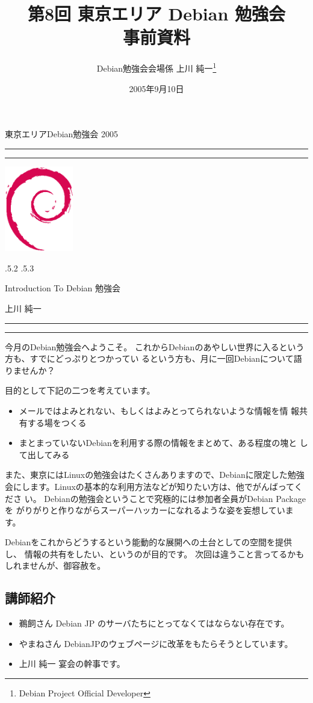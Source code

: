 \documentclass[mingoth,a4paper]{jsarticle}
\makeatletter
\renewcommand{\section}{\@startsection{section}{1}{\z@}%
    {\Cvs \@plus.5\Cdp \@minus.2\Cdp}%
    {.5\Cvs \@plus.3\Cdp}%
    {\normalfont\Large\headfont\raggedright\centering}} %
\newcommand{\dancersection}[2]{%
\newpage
東京エリアDebian勉強会 2005
\hrule
\vspace{0.5mm}
\hrule
\hfill{}\includegraphics[width=3cm]{image200502/openlogo-nd.eps}\\
\vspace{-4cm}
\begin{center}
  \section{#1}
\end{center}
\hfill{}#2\hspace{3cm}\space\\
\hrule
\hrule
\vspace{1cm}
}
\makeatother
\begin{document}
\begin{titlepage}

\title{
 第8回 東京エリア Debian 勉強会\\事前資料}
\date{2005年9月10日}
\author{Debian勉強会会場係 上川 純一\thanks{Debian Project Official Developer}} 
\maketitle
\thispagestyle{empty}
\end{titlepage}

\newpage
\tableofcontents

\dancersection{Introduction To Debian 勉強会}{上川 純一}

今月のDebian勉強会へようこそ。
これからDebianのあやしい世界に入るという方も、すでにどっぷりとつかってい
るという方も、月に一回Debianについて語りませんか？

目的として下記の二つを考えています。

\begin{itemize}
 \item メールではよみとれない、もしくはよみとってられないような情報を情
       報共有する場をつくる
 \item まとまっていないDebianを利用する際の情報をまとめて、ある程度の塊と
       して出してみる
\end{itemize}

また、東京にはLinuxの勉強会はたくさんありますので、Debianに限定した勉強
会にします。Linuxの基本的な利用方法などが知りたい方は、他でがんばってくださ
い。
Debianの勉強会ということで究極的には参加者全員がDebian Packageを
がりがりと作りながらスーパーハッカーになれるような姿を妄想しています。

Debianをこれからどうするという能動的な展開への土台としての空間を提供し、
情報の共有をしたい、というのが目的です。
次回は違うこと言ってるかもしれませんが、御容赦を。

\subsection{講師紹介}

\begin{itemize}
 \item{鵜飼さん} Debian JP のサーバたちにとってなくてはならない存在です。
 \item{やまねさん} DebianJPのウェブページに改革をもたらそうとしています。
 \item{上川 純一} 宴会の幹事です。
\end{itemize}
\end{document}
